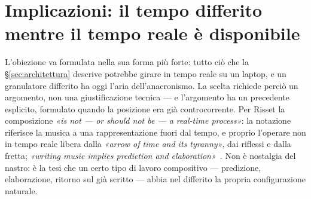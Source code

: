 %
%

\section{Implicazioni: il tempo differito mentre il tempo reale è disponibile}\label{sec:implicazioni}

L'obiezione va formulata nella sua forma più forte: tutto ciò che la
\S\ref{sec:architettura} descrive potrebbe girare in tempo reale su un
laptop, e un granulatore differito ha oggi l'aria dell'anacronismo. La
scelta richiede perciò un argomento, non una giustificazione tecnica ---
e l'argomento ha un precedente esplicito, formulato quando la posizione
era già controcorrente. Per Risset la composizione \emph{«is not --- or
should not be --- a real-time process»}: la notazione riferisce la
musica a una rappresentazione fuori dal tempo, e proprio l'operare non
in tempo reale libera dalla \emph{«arrow of time and its tyranny»},
dai riflessi e dalla fretta; \emph{«writing music implies prediction and
elaboration»}~\cite{Risset1999}. Non è nostalgia del nastro: è la tesi
che un certo tipo di lavoro compositivo --- predizione, elaborazione,
ritorno sul già scritto --- abbia nel differito la propria
configurazione naturale.

